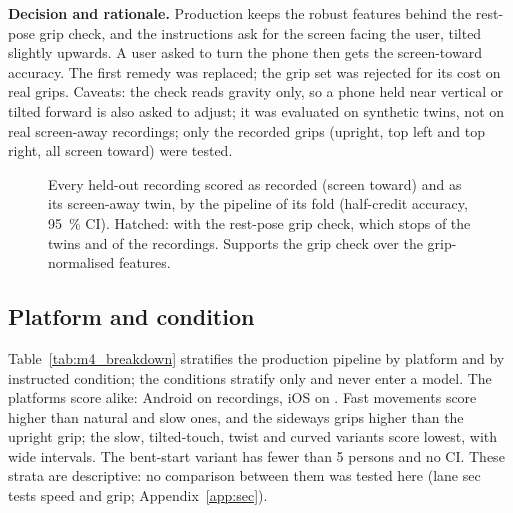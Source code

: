 \textbf{Decision and rationale.}
Production keeps the robust features behind the rest-pose grip check, and the instructions ask for the screen facing the user, tilted slightly upwards.
A user asked to turn the phone then gets the screen-toward accuracy.
The first remedy was replaced; the grip set was rejected for its cost on real grips.
Caveats: the check reads gravity only, so a phone held near vertical or tilted forward is also asked to adjust; it was evaluated on synthetic twins, not on real screen-away recordings; only the recorded grips (upright, top left and top right, all screen toward) were tested.

\begin{figure}[htbp]
  \centering
  \caption{Every held-out recording scored as recorded (screen toward) and as its screen-away twin, by the pipeline of its fold (half-credit accuracy, 95~\% CI). Hatched: with the rest-pose grip check, which stops  of the twins and  of the recordings. Supports the grip check over the grip-normalised features.}
  \label{fig:M4_12_screen_flip}\label{fig:app:prod-grip}
\end{figure}
\FloatBarrier

\subsection{Platform and condition}\label{app:prod:breakdown}

Table~\ref{tab:m4_breakdown} stratifies the production pipeline by platform and by instructed condition; the conditions stratify only and never enter a model.
The platforms score alike: Android  on  recordings, iOS  on .
Fast movements score higher than natural and slow ones, and the sideways grips higher than the upright grip; the slow, tilted-touch, twist and curved variants score lowest, with wide intervals.
The bent-start variant has fewer than 5 persons and no CI.
These strata are descriptive: no comparison between them was tested here (lane sec tests speed and grip; Appendix~\ref{app:sec}).

\FloatBarrier

